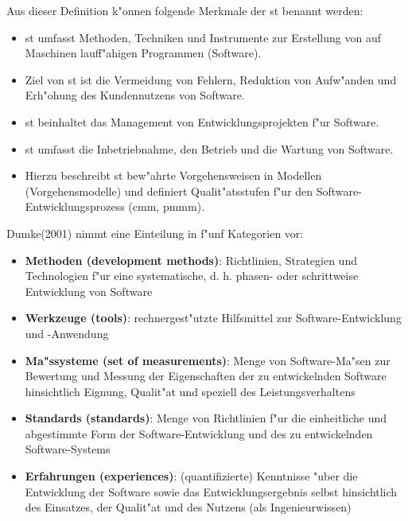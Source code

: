 Aus dieser Definition k"onnen folgende Merkmale der \gls{st} benannt werden:
\bigbreak
\begin{itemize}
\item \gls{st} umfasst Methoden, Techniken und Instrumente zur Erstellung von auf Maschinen lauff"ahigen Programmen (Software).
\item Ziel von \gls{st} ist die Vermeidung von Fehlern, Reduktion von Aufw"anden und Erh"ohung des Kundennutzens von Software.
\item \gls{st} beinhaltet das Management von Entwicklungsprojekten f"ur Software.
\item \gls{st} umfasst die Inbetriebnahme, den Betrieb und die Wartung von Software.
\item Hierzu beschreibt \gls{st} bew"ahrte Vorgehensweisen in Modellen (Vorgehensmodelle) und definiert Qualit"atsstufen f"ur den Software-Entwicklungsprozess (\gls{cmm}, \gls{pmmm}).
\end{itemize}

\newpage

Dumke(2001)\supercite{Dumke2001} nimmt eine Einteilung in f"unf Kategorien vor:
\bigbreak
\begin{itemize}
\item \textbf{Methoden (development methods)}: \smallbreak Richtlinien, Strategien und Technologien f"ur eine systematische, d. h. phasen- oder schrittweise Entwicklung von Software

\item \textbf{Werkzeuge (tools)}: \smallbreak rechnergest"utzte Hilfsmittel zur Software-Entwicklung und -Anwendung

\item \textbf{Ma"ssysteme (set of measurements)}: \smallbreak Menge von Software-Ma"sen zur Bewertung und Messung der Eigenschaften der zu entwickelnden Software hinsichtlich Eignung, Qualit"at und speziell des Leistungsverhaltens

\item \textbf{Standards (standards)}: \smallbreak Menge von Richtlinien f"ur die einheitliche und abgestimmte Form der Software-Entwicklung und des zu entwickelnden Software-Systems

\item \textbf{Erfahrungen (experiences)}: \smallbreak (quantifizierte) Kenntnisse "uber die Entwicklung der Software sowie das Entwicklungsergebnis selbst hinsichtlich des Einsatzes, der Qualit"at und des Nutzens (als Ingenieurwissen)
\end{itemize}


